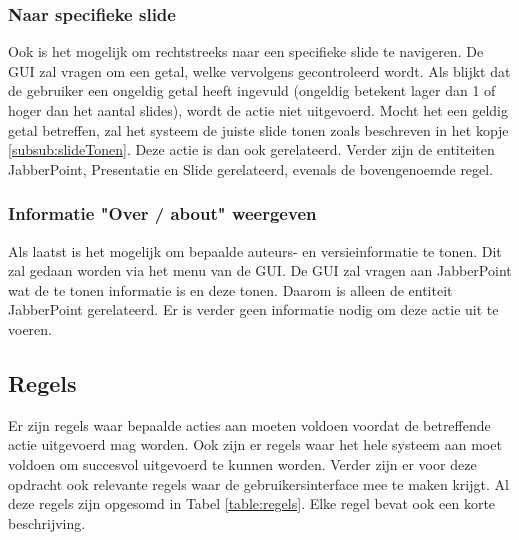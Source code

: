 \documentclass[a4paper]{article}
\newcommand{\1}[0]{\'{e}\'{e}n}
\begin{document}
\subsubsection{Naar specifieke slide}
Ook is het mogelijk om rechtstreeks naar een specifieke slide te navigeren. De GUI zal vragen om een getal, welke vervolgens gecontroleerd wordt. Als blijkt dat de gebruiker een ongeldig getal heeft ingevuld (ongeldig betekent lager dan 1 of hoger dan het aantal slides), wordt de actie niet uitgevoerd. Mocht het een geldig getal betreffen, zal het systeem de juiste slide tonen zoals beschreven in het kopje \ref{subsub:slideTonen}. Deze actie is dan ook gerelateerd. Verder zijn de entiteiten JabberPoint, Presentatie en Slide gerelateerd, evenals de bovengenoemde regel.

\subsubsection{Informatie "Over / about" weergeven}
Als laatst is het mogelijk om bepaalde auteurs- en versieinformatie te tonen. Dit zal gedaan worden via het menu van de GUI. De GUI zal vragen aan JabberPoint wat de te tonen informatie is en deze tonen. Daarom is alleen de entiteit JabberPoint gerelateerd. Er is verder geen informatie nodig om deze actie uit te voeren. 

\subsection{Regels}
\label{sub:regels}

Er zijn regels waar bepaalde acties aan moeten voldoen voordat de betreffende actie uitgevoerd mag worden. Ook zijn er regels waar het hele systeem aan moet voldoen om succesvol uitgevoerd te kunnen worden. Verder zijn er voor deze opdracht ook relevante regels waar de gebruikersinterface mee te maken krijgt. Al deze regels zijn opgesomd in Tabel \ref{table:regels}. Elke regel bevat ook een korte beschrijving.
\end{document}
